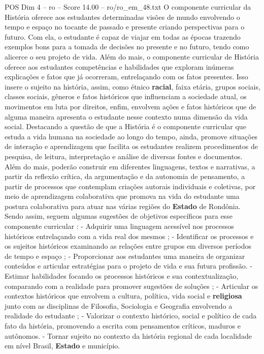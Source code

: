 \begin{textsample}{POS Dim 4 – ro – Score 14.00 – ro/ro\_em\_48.txt}
O componente curricular da História oferece aos estudantes determinadas visões de mundo envolvendo o tempo e espaço no tocante de passado e presente criando perspectivas para o futuro.
Com ela, o estudante é capaz de viajar em todas as épocas trazendo exemplos bons para a tomada de decisões no presente e no futuro, tendo como alicerce o seu projeto de vida.
Além do mais, o componente curricular de História oferece aos estudantes competências e habilidades que exploram inúmeras explicações e fatos que já ocorreram, entrelaçando com os fatos presentes.
Isso insere o sujeito na história, assim, como étnico \textbf{racial}, faixa etária, grupos sociais, classes sociais, gêneros e fatos históricos que influenciam a sociedade atual, os movimentos em luta por direitos, enfim, envolvem ações e fatos históricos que de alguma maneira apresenta o estudante nesse contexto numa dimensão da vida social.
Destacando a questão de que a História é o componente curricular que estuda a vida humana na sociedade ao longo do tempo, ainda, promove situações de interação e aprendizagem que facilita os estudantes realizem procedimentos de pesquisa, de leitura, interpretação e análise de diversas fontes e documentos.
Além do mais, poderão construir em diferentes linguagens, textos e narrativas, a partir da reflexão crítica, da argumentação e da autonomia de pensamento, a partir de processos que contemplam criações autorais individuais e coletivas, por meio de aprendizagem colaborativa que promova na vida do estudante uma postura colaborativa para atuar nas várias regiões do \textbf{Estado} de Rondônia.
Sendo assim, seguem algumas sugestões de objetivos específicos para esse componente curricular : - Adquirir uma linguagem acessível nos processos históricos entrelaçando com a vida real dos mesmos ; - Identificar os processos e os sujeitos históricos examinando as relações entre grupos em diversos períodos de tempo e espaço ; - Proporcionar aos estudantes uma maneira de organizar conteúdos e articular estratégias para o projeto de vida e sua futura profissão. - Estimar habilidades focando os processos históricos e sua contextualização, comparando com a realidade para promover sugestões de soluções ; - Articular os contextos históricos que envolvem a cultura, política, vida social e \textbf{religiosa} junto com as disciplinas de Filosofia, Sociologia e Geografia envolvendo a realidade do estudante ; - Valorizar o contexto histórico, social e político de cada fato da história, promovendo a escrita com pensamentos críticos, maduros e autônomos. - Tornar sujeito no contexto da história regional de cada localidade em nível Brasil, \textbf{Estado} e município.

\end{textsample}
